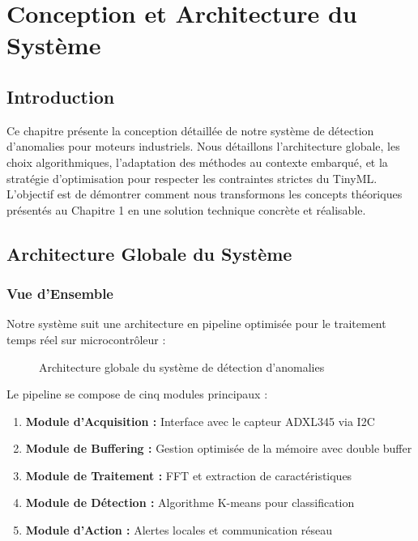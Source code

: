 \chapter{Conception et Architecture du Système}

\section{Introduction}

Ce chapitre présente la conception détaillée de notre système de détection d'anomalies pour moteurs industriels. Nous détaillons l'architecture globale, les choix algorithmiques, l'adaptation des méthodes au contexte embarqué, et la stratégie d'optimisation pour respecter les contraintes strictes du TinyML. L'objectif est de démontrer comment nous transformons les concepts théoriques présentés au Chapitre 1 en une solution technique concrète et réalisable.

\section{Architecture Globale du Système}

\subsection{Vue d'Ensemble}

Notre système suit une architecture en pipeline optimisée pour le traitement temps réel sur microcontrôleur :

\begin{figure}[h]
\centering
\caption{Architecture globale du système de détection d'anomalies}
\label{fig:architecture_globale}
\end{figure}

Le pipeline se compose de cinq modules principaux :
\begin{enumerate}
    \item \textbf{Module d'Acquisition :} Interface avec le capteur ADXL345 via I2C
    \item \textbf{Module de Buffering :} Gestion optimisée de la mémoire avec double buffer
    \item \textbf{Module de Traitement :} FFT et extraction de caractéristiques
    \item \textbf{Module de Détection :} Algorithme K-means pour classification
    \item \textbf{Module d'Action :} Alertes locales et communication réseau
\end{enumerate}

